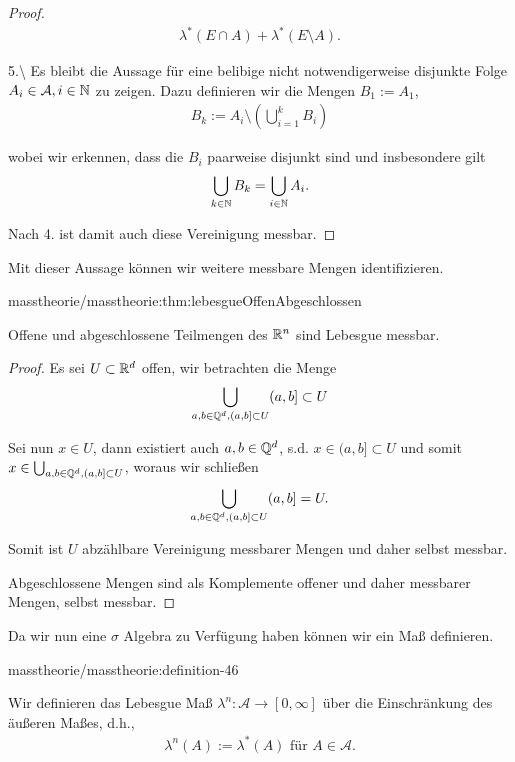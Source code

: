 \begin{proof}
\begin{align*}
\lambda^\ast(E\cap A) + \lambda^\ast(E\setminus A).
\end{align*}
\par
5.\textbackslash{} Es bleibt die Aussage für eine belibige nicht notwendigerweise disjunkte Folge \(A_i\in\mathcal{A}, i\in\mathbb{N}\) zu zeigen. Dazu definieren wir die Mengen \(B_1:=A_1\),
\begin{align*}
B_k := A_i\setminus \left(\bigcup_{i=1}^k B_i  \right)
\end{align*}
\par
wobei wir erkennen, dass die \(B_i\) paarweise disjunkt sind und insbesondere gilt
\begin{align*}
\bigcup_{k\in\mathbb{N}} B_k = \bigcup_{i\in\mathbb{N}} A_i.
\end{align*}
\par
Nach 4. ist damit auch diese Vereinigung messbar.
\end{proof}

\par
Mit dieser Aussage können wir weitere messbare Mengen identifizieren.
\begin{lemma}{}{masstheorie/masstheorie:thm:lebesgueOffenAbgeschlossen}



\par
Offene und abgeschlossene Teilmengen des \(\mathbb{R}^n\) sind Lebesgue messbar.
\end{lemma}

\begin{proof}
 Es sei \(U\subset\mathbb{R}^d\) offen, wir betrachten die Menge
\begin{align*}
\bigcup_{a,b\in \mathbb{Q}^d, (a,b]\subset U} (a,b]\subset U
\end{align*}
\par
Sei nun \(x\in U\), dann existiert auch \(a,b\in\mathbb{Q}^d\), s.d. \(x\in(a,b]\subset U\) und somit \(x\in\bigcup_{a,b\in \mathbb{Q}^d, (a,b]\subset U}\), woraus wir schließen
\begin{align*}
\bigcup_{a,b\in \mathbb{Q}^d, (a,b]\subset U} (a,b] = U.
\end{align*}
\par
Somit ist \(U\) abzählbare Vereinigung messbarer Mengen und daher selbst messbar.

\par
Abgeschlossene Mengen sind als Komplemente offener und daher messbarer Mengen, selbst messbar.
\end{proof}

\par
Da wir nun eine \(\sigma\) Algebra zu Verfügung haben können wir ein Maß definieren.
\begin{definition}{}{masstheorie/masstheorie:definition-46}



\par
Wir definieren das Lebesgue Maß \(\lambda^n:\mathcal{A}\to[0,\infty]\) über die Einschränkung des äußeren Maßes, d.h.,
\begin{align*}
\lambda^n(A):= \lambda^\ast(A)\text{ für } A\in\mathcal{A}.
\end{align*}\end{definition}

